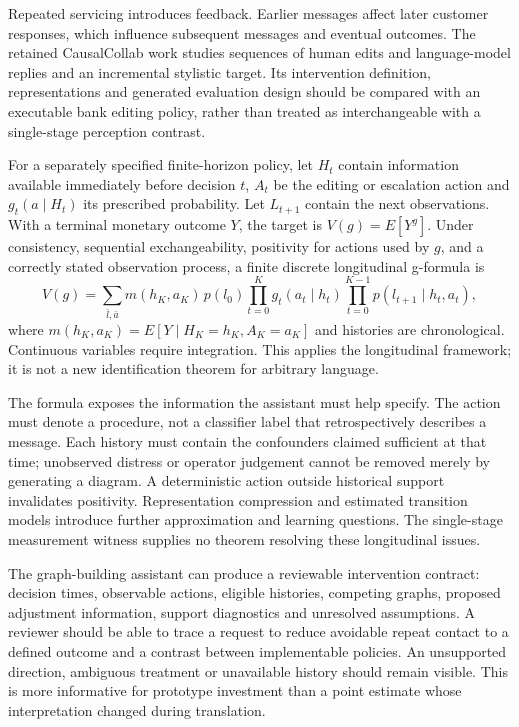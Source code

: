 Repeated servicing introduces feedback. Earlier messages affect later customer responses, which influence subsequent messages and eventual outcomes. The retained CausalCollab work studies sequences of human edits and language-model replies and an incremental stylistic target. Its intervention definition, representations and generated evaluation design should be compared with an executable bank editing policy, rather than treated as interchangeable with a single-stage perception contrast.\citep{exec13_census_collaboration}

For a separately specified finite-horizon policy, let $H_t$ contain information available immediately before decision $t$, $A_t$ be the editing or escalation action and $g_t(a\mid H_t)$ its prescribed probability. Let $L_{t+1}$ contain the next observations. With a terminal monetary outcome $Y$, the target is $V(g)=E[Y^g]$. Under consistency, sequential exchangeability, positivity for actions used by $g$, and a correctly stated observation process, a finite discrete longitudinal g-formula is
\begin{equation}
 V(g)=\sum_{\bar l,\bar a}m(h_K,a_K)\,p(l_0)
 \prod_{t=0}^{K}g_t(a_t\mid h_t)
 \prod_{t=0}^{K-1}p(l_{t+1}\mid h_t,a_t),
 \label{eq:exec28-lm-policy}
\end{equation}
where $m(h_K,a_K)=E[Y\mid H_K=h_K,A_K=a_K]$ and histories are chronological. Continuous variables require integration. This applies the longitudinal framework; it is not a new identification theorem for arbitrary language.\citep{hernan2020}

The formula exposes the information the assistant must help specify. The action must denote a procedure, not a classifier label that retrospectively describes a message. Each history must contain the confounders claimed sufficient at that time; unobserved distress or operator judgement cannot be removed merely by generating a diagram. A deterministic action outside historical support invalidates positivity. Representation compression and estimated transition models introduce further approximation and learning questions. The single-stage measurement witness supplies no theorem resolving these longitudinal issues.

The graph-building assistant can produce a reviewable intervention contract: decision times, observable actions, eligible histories, competing graphs, proposed adjustment information, support diagnostics and unresolved assumptions. A reviewer should be able to trace a request to reduce avoidable repeat contact to a defined outcome and a contrast between implementable policies. An unsupported direction, ambiguous treatment or unavailable history should remain visible. This is more informative for prototype investment than a point estimate whose interpretation changed during translation.

